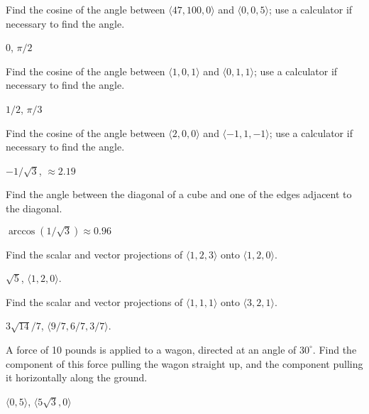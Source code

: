 \begin{enumialphparenastyle}
\begin{ex}
Find the cosine of the angle between $\langle 47,100,0\rangle$
and $\langle 0,0,5\rangle$; use a calculator if necessary to find the angle.
\begin{sol}
	$0$, $\pi/2$
\end{sol}
\end{ex}

\begin{ex}
Find the cosine of the angle between $\langle 1,0,1 \rangle$
and $\langle 0,1,1\rangle$; use a calculator if necessary to find the angle.
\begin{sol}
	$1/2$, $\pi/3$
\end{sol}
\end{ex}

\begin{ex}
Find the cosine of the angle between $\langle 2,0,0\rangle$
and $\langle -1,1,-1\rangle$; use a calculator if necessary to find the angle.
\begin{sol}
	$-1/\sqrt3$, $\approx 2.19$
\end{sol}
\end{ex}

\begin{ex}
Find the angle between the diagonal of a cube and one of the
edges adjacent to the diagonal.
\begin{sol}
	$\arccos(1/\sqrt3)\approx 0.96$
\end{sol}
\end{ex}

\begin{ex}
Find the scalar and vector projections of $\langle 1,2,3\rangle$
onto $\langle 1,2,0\rangle$.
\begin{sol}
	$\sqrt{5}$, $\langle 1,2,0\rangle$.
\end{sol}
\end{ex}

\begin{ex}
Find the scalar and vector projections of $\langle 1,1,1\rangle$
onto $\langle 3,2,1\rangle$.
\begin{sol}
	$3\sqrt{14}/7$, $\langle 9/7,6/7,3/7\rangle$.
\end{sol}
\end{ex}

\begin{ex}
A force of 10 pounds is applied to a wagon, directed at an
angle of $30^\circ$. Find the component of this force pulling the
wagon straight up, and the component pulling it horizontally along
the ground.
\begin{sol}
	$\langle 0,5\rangle$, $\langle 5\sqrt3,0\rangle$
\end{sol}


\end{ex}
\end{enumialphparenastyle}
